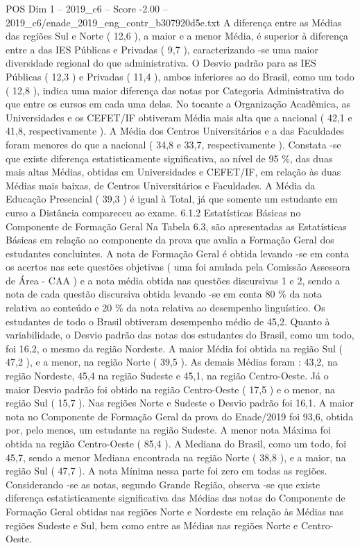 \begin{textsample}{POS Dim 1 – 2019\_c6 – Score -2.00 – 2019\_c6/enade\_2019\_eng\_contr\_b307920d5e.txt}
A diferença entre as Médias das regiões Sul e Norte ( 12,6 ), a maior e a menor Média, é superior à diferença entre a das IES Públicas e Privadas ( 9,7 ), caracterizando -se uma maior diversidade regional do que administrativa.
O Desvio padrão para as IES Públicas ( 12,3 ) e Privadas ( 11,4 ), ambos inferiores ao do Brasil, como um todo ( 12,8 ), indica uma maior diferença das notas por Categoria Administrativa do que entre os cursos em cada uma delas.
No tocante a Organização Acadêmica, as Universidades e os CEFET/IF obtiveram Média mais alta que a nacional ( 42,1 e 41,8, respectivamente ).
A Média dos Centros Universitários e a das Faculdades foram menores do que a nacional ( 34,8 e 33,7, respectivamente ).
Constata -se que existe diferença estatisticamente significativa, ao nível de 95 \%, das duas mais altas Médias, obtidas em Universidades e CEFET/IF, em relação às duas Médias mais baixas, de Centros Universitários e Faculdades.
A Média da Educação Presencial ( 39,3 ) é igual à Total, já que somente um estudante em curso a Distância compareceu ao exame. 6.1.2 Estatísticas Básicas no Componente de Formação Geral Na Tabela 6.3, são apresentadas as Estatísticas Básicas em relação ao componente da prova que avalia a Formação Geral dos estudantes concluintes.
A nota de Formação Geral é obtida levando -se em conta os acertos nas sete questões objetivas ( uma foi anulada pela Comissão Assessora de Área - CAA ) e a nota média obtida nas questões discursivas 1 e 2, sendo a nota de cada questão discursiva obtida levando -se em conta 80 \% da nota relativa ao conteúdo e 20 \% da nota relativa ao desempenho linguístico.
Os estudantes de todo o Brasil obtiveram desempenho médio de 45,2.
Quanto à variabilidade, o Desvio padrão das notas dos estudantes do Brasil, como um todo, foi 16,2, o mesmo da região Nordeste.
A maior Média foi obtida na região Sul ( 47,2 ), e a menor, na região Norte ( 39,5 ).
As demais Médias foram : 43,2, na região Nordeste, 45,4 na região Sudeste e 45,1, na região Centro-Oeste.
Já o maior Desvio padrão foi obtido na região Centro-Oeste ( 17,5 ) e o menor, na região Sul ( 15,7 ).
Nas regiões Norte e Sudeste o Desvio padrão foi 16,1.
A maior nota no Componente de Formação Geral da prova do Enade/2019 foi 93,6, obtida por, pelo menos, um estudante na região Sudeste.
A menor nota Máxima foi obtida na região Centro-Oeste ( 85,4 ).
A Mediana do Brasil, como um todo, foi 45,7, sendo a menor Mediana encontrada na região Norte ( 38,8 ), e a maior, na região Sul ( 47,7 ).
A nota Mínima nessa parte foi zero em todas as regiões.
Considerando -se as notas, segundo Grande Região, observa -se que existe diferença estatisticamente significativa das Médias das notas do Componente de Formação Geral obtidas nas regiões Norte e Nordeste em relação às Médias nas regiões Sudeste e Sul, bem como entre as Médias nas regiões Norte e Centro-Oeste.

\end{textsample}
